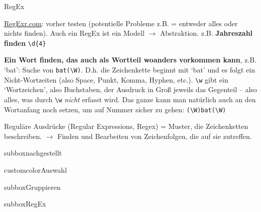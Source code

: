 \begin{frame}{RegEx}
\footnotesize

\href{http://regexr.com}{RegExr.com}: vorher testen (potentielle Probleme z.B. = entweder alles oder nichts finden).
Auch ein RegEx ist ein Modell $\to$ Abstraktion. z.B. \textbf{Jahreszahl finden} \verb|\d{4}|
\smallskip

\textbf{Ein Wort finden, das auch als Wortteil woanders vorkommen kann}, z.B. `bat': Suche von \verb|bat(\W)|. D.h. die Zeichenkette beginnt mit `bat' und es folgt ein Nicht-Wortzeiten (also Space, Punkt, Komma, Hyphen, etc.). \verb|\w| gibt ein `Wortzeichen', also Buchstaben, der Ausdruck in Groß jeweils das Gegenteil -- also alles, was durch \verb|\w| \emph{nicht} erfasst wird.
Das ganze kann man natürlich auch an den Wortanfang noch setzen, um auf Nummer sicher zu gehen: \verb|(\W)bat(\W)|
\smallskip

Reguläre Ausdrücke (Regular Expressions, Regex) = Muster, die Zeichenketten beschreiben. 
$\to$ Finden und Bearbeiten von Zeichenfolgen, die auf sie zutreffen.

\begin{multibox}{2} %
\begin{subbox}{subbox}{nachgestellt}\footnotesize


\end{subbox}
\begin{subbox}{customcolor}{Auswahl}\footnotesize



\end{subbox}
\end{multibox}

\begin{multibox}{2} %
\begin{subbox}{subbox}{Gruppieren}\footnotesize



\end{subbox}
\begin{subbox}{subbox}{RegEx}\footnotesize
{}

\end{subbox}
\end{multibox}

\end{frame}
